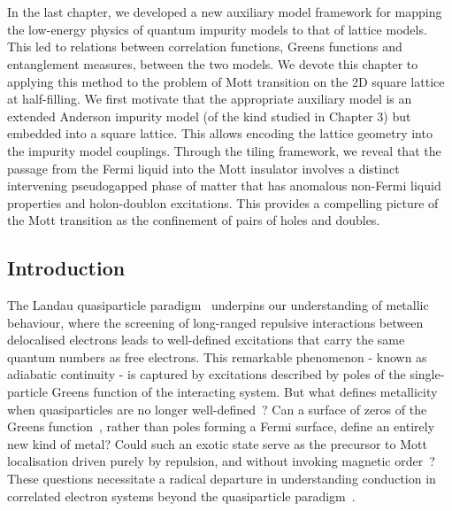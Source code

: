 \chapter{\chapE}\label{sec:tileESIAM}
In the last chapter, we developed a new auxiliary model framework for mapping the low-energy physics of quantum impurity models to that of lattice models. This led to relations between correlation functions, Greens functions  and entanglement measures, between the two models. We devote this chapter to applying this method to the problem of Mott transition on the 2D square lattice at half-filling. We first motivate that the appropriate auxiliary model is an extended Anderson impurity model (of the kind studied in Chapter 3) but embedded into a square lattice. This allows encoding the lattice geometry into the impurity model couplings. Through the tiling framework, we reveal that the passage from the Fermi liquid into the Mott insulator involves a distinct intervening pseudogapped phase of matter that has anomalous non-Fermi liquid properties and holon-doublon excitations. This provides a compelling picture of the Mott transition as the confinement of pairs of holes and doubles.

\section{Introduction}
The Landau quasiparticle paradigm~\cite{landau1959theory} underpins our understanding of metallic behaviour, where the screening of long-ranged repulsive interactions between delocalised electrons leads to well-defined excitations that carry the same quantum numbers as free electrons. This remarkable phenomenon - known as adiabatic continuity -  is captured by excitations described by poles of the single-particle Greens function of the interacting system. But what defines metallicity when quasiparticles are no longer well-defined~\cite{Phillips2013Unparticles}? Can a surface of zeros of the Greens function~\cite{dzyaloshinskii2003some}, rather than poles forming a Fermi surface, define an entirely new kind of metal? Could such an exotic state serve as the precursor to Mott localisation driven purely by repulsion, and without invoking magnetic order~\cite{Mott_1949}? These questions necessitate a radical departure in understanding conduction in correlated electron systems beyond the quasiparticle paradigm~\cite{phillips2022}. \\

